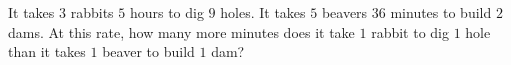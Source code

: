 It takes $3$ rabbits $5$ hours to dig $9$ holes. It takes $5$ beavers $36$ minutes to build $2$ dams. At this rate, how many more minutes does it take $1$ rabbit to dig $1$ hole than it takes $1$ beaver to build $1$ dam?